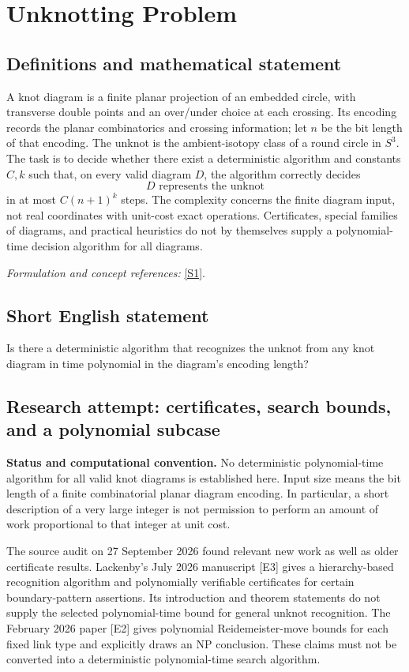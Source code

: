 \documentclass[11pt]{article}
\begin{document}
\section*{\texorpdfstring{Unknotting Problem}{Unknotting Problem}}\label{statement}
\subsection{Definitions and mathematical statement}
A knot diagram is a finite planar projection of an embedded circle, with transverse double points and an over/under choice at each crossing. Its encoding records the planar combinatorics and crossing information; let $n$ be the bit length of that encoding. The unknot is the ambient-isotopy class of a round circle in $S^3$. The task is to decide whether there exist a deterministic algorithm and constants $C,k$ such that, on every valid diagram $D$, the algorithm correctly decides
\[
 D\text{ represents the unknot}
\]
in at most $C(n+1)^k$ steps. The complexity concerns the finite diagram input, not real coordinates with unit-cost exact operations. Certificates, special families of diagrams, and practical heuristics do not by themselves supply a polynomial-time decision algorithm for all diagrams.
\par\smallskip\textit{Formulation and concept references:} \href{https://arxiv.org/abs/1211.1079}{[S1]}.

\subsection{Short English statement}
Is there a deterministic algorithm that recognizes the unknot from any knot diagram in time polynomial in the diagram's encoding length?
\subsection{Research attempt: certificates, search bounds, and a polynomial subcase}
\textbf{Status and computational convention.} No deterministic polynomial-time algorithm for all valid knot diagrams is established here. Input size means the bit length of a finite combinatorial planar diagram encoding. In particular, a short description of a very large integer is not permission to perform an amount of work proportional to that integer at unit cost.

The source audit on 27 September 2026 found relevant new work as well as older certificate results. Lackenby's July 2026 manuscript [E3] gives a hierarchy-based recognition algorithm and polynomially verifiable certificates for certain boundary-pattern assertions. Its introduction and theorem statements do not supply the selected polynomial-time bound for general unknot recognition. The February 2026 paper [E2] gives polynomial Reidemeister-move bounds for each fixed link type and explicitly draws an NP conclusion. These claims must not be converted into a deterministic polynomial-time search algorithm.
\end{document}
